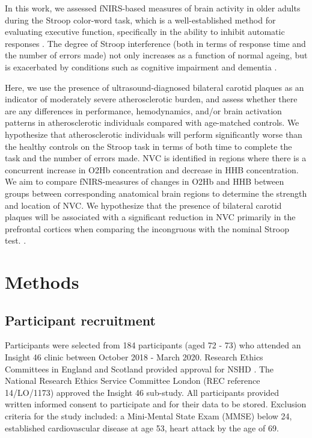 \documentclass[12pt]{spieman}  %
\begin{document}
\begin{spacing}{2}
In this work, we assessed fNIRS-based measures of brain activity in older adults during the Stroop color-word task, which is a well-established method for evaluating executive function, specifically in the ability to inhibit automatic responses \cite{Stroop1935, Scarpina2017, Vendrell1995}. The degree of Stroop interference (both in terms of response time and the number of errors made) not only increases as a function of normal ageing\cite{Davidson2003}, but is exacerbated by conditions such as cognitive impairment and dementia \cite{Amieva2004, Lague-Beauvais2013a, Spieler1996}.

Here, we use the presence of ultrasound-diagnosed bilateral carotid plaques as an indicator of moderately severe atherosclerotic burden, and assess whether there are any differences in performance, hemodynamics, and/or brain activation patterns in atherosclerotic individuals compared with age-matched controls. We hypothesize that atherosclerotic individuals will perform significantly worse than the healthy controls on the Stroop task in terms of both time to complete the task and the number of errors made. NVC is identified in regions where there is a concurrent increase in O2Hb concentration and decrease in HHB concentration. We aim to compare fNIRS-measures of changes in O2Hb and HHB between groups between corresponding anatomical brain regions to determine the strength and location of NVC. We hypothesize that the presence of bilateral carotid plaques will be associated with a significant reduction in NVC primarily in the prefrontal cortices when comparing the incongruous with the nominal Stroop test.
.

\section{Methods}
\label{sect:methods}
\subsection{Participant recruitment}
 Participants were selected from 184 participants (aged 72 - 73) who attended an Insight 46 clinic between October 2018 - March 2020.  Research Ethics Committees in England and Scotland provided approval for NSHD \cite{Kuh2011, Kuh2016, Lane2017, Hardy2016}. The National Research Ethics Service Committee London (REC reference 14/LO/1173) approved the Insight 46 sub-study. All participants provided written informed consent to participate and for their data to be stored. Exclusion criteria for the study included: a Mini-Mental State Exam (MMSE) below 24, established cardiovascular disease at age 53, heart attack by the age of 69.  



\end{spacing}
\end{document}
